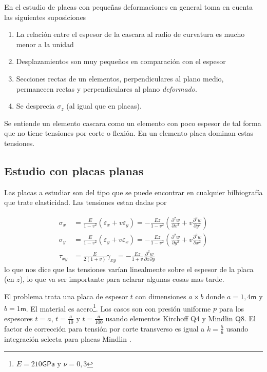 \documentclass[onecolumn,10pt,titlepage]{article}
\newcommand{\unit}[1]{\textsf{#1}}
\newcommand{\giga}{\unit{G}}
\newcommand{\meter}{\unit{m}}
\newcommand{\pascal}{\unit{Pa}}
\newcommand{\si}[1]{#1}
\newcommand{\SI}[2]{#1\si{#2}}
\begin{document}
En el estudio de placas con pequeñas deformaciones en general toma en cuenta las siguientes suposiciones\cite{ugural2003advanced}

\begin{enumerate}
	\item La relación entre el espesor de la cascara al radio de curvatura es mucho menor a la unidad
	\item Desplazamientos son muy pequeños en comparación con el espesor
	\item Secciones rectas de un elementos, perpendiculares al plano medio, permanecen rectas y perpendiculares al plano \textit{deformado}.
	\item Se desprecia $\sigma_z$ (al igual que en placas).
\end{enumerate}

Se entiende un elemento cascara como un elemento con poco espesor de tal forma que no tiene tensiones por corte o flexión. En un elemento placa dominan estas tensiones. 


\subsection{Estudio con placas planas}
Las placas a estudiar son del tipo que se puede encontrar en cualquier bilbiografía que trate elasticidad\cite{ugural2003advanced}. Las tensiones estan dadas por 

\begin{align} \sigma_{x} &=\frac{E}{1-v^{2}}\left(\varepsilon_{x}+v \varepsilon_{y}\right)=-\frac{E z}{1-v^{2}}\left(\frac{\partial^{2} w}{\partial x^{2}}+v \frac{\partial^{2} w}{\partial y^{2}}\right) \\ \sigma_{y} &=\frac{E}{1-v^{2}}\left(\varepsilon_{y}+v \varepsilon_{x}\right)=-\frac{E z}{1-v^{2}}\left(\frac{\partial^{2} w}{\partial y^{2}}+v \frac{\partial^{2} w}{\partial x^{2}}\right) \\ \tau_{x y} &=\frac{E}{2(1+v)} \gamma_{x y}=-\frac{E z}{1+v} \frac{\partial^{2} w}{\partial x \partial y} 
\end{align}
lo que nos dice que las tensiones varían linealmente sobre el espesor de la placa (en $z$), lo que va ser importante para aclarar algunas cosas mas tarde.


El problema trata una placa de espesor $t$ con dimensiones $a\times b$ donde $a=1,4\si{\meter}$ y $b=1\si{\meter}$. El material es acero\footnote{$E=\SI{210}{\giga \pascal}$ y $\nu=0,3$}. Los casos son con presión uniforme $p$ para los espesores $t=a$, $t=\frac{a}{10}$ y $t=\frac{a}{100}$ usando elementos Kirchoff Q4 y Mindlin Q8. El factor de corrección para tensión por corte transverso es igual a $k=\frac{5}{6}$ usando integración selecta\citep{cook2007concepts} para placas Mindlin . 
\end{document}
